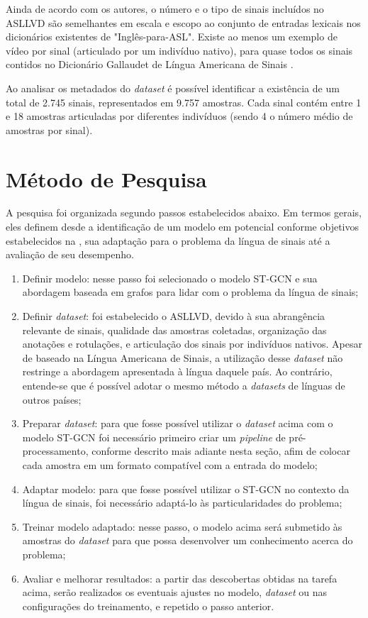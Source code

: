Ainda de acordo com os autores, o número e o tipo de sinais incluídos no ASLLVD são semelhantes em escala e escopo ao conjunto de entradas lexicais nos dicionários existentes de "Inglês-para-ASL". Existe ao menos um exemplo de vídeo por sinal (articulado por um indivíduo nativo), para quase todos os sinais contidos no Dicionário Gallaudet de Língua Americana de Sinais \cite{athitsos-asllvd-2008, gallaudet-2005}. 

Ao analisar os metadados do \textit{dataset} é possível identificar a existência de um total de 2.745 sinais, representados em 9.757 amostras. Cada sinal contém entre 1 e 18 amostras articuladas por diferentes indivíduos (sendo 4 o número médio de amostras por sinal).


\section{Método de Pesquisa} %

A pesquisa foi organizada segundo passos estabelecidos abaixo. Em termos gerais, eles definem desde a identificação de um modelo em potencial conforme objetivos estabelecidos na , sua adaptação para o problema da língua de sinais até a avaliação de seu desempenho.

\begin{enumerate}
    \item Definir modelo: nesse passo foi selecionado o modelo ST-GCN e sua abordagem baseada em grafos para lidar com o problema da língua de sinais;
    \item Definir \textit{dataset}: foi estabelecido o ASLLVD, devido à sua abrangência relevante de sinais, qualidade das amostras coletadas, organização das anotações e rotulações, e articulação dos sinais por indivíduos nativos. Apesar de baseado na Língua Americana de Sinais, a utilização desse \textit{dataset} não restringe a abordagem apresentada à língua daquele país. Ao contrário, entende-se que é possível adotar o mesmo método a \textit{datasets} de línguas de outros países;
    \item Preparar \textit{dataset}: para que fosse possível utilizar o \textit{dataset} acima com o modelo ST-GCN foi necessário primeiro criar um \textit{pipeline} de pré-processamento, conforme descrito mais adiante nesta seção, afim de colocar cada amostra em  um formato compatível com a entrada do modelo;
    \item Adaptar modelo: para que fosse possível utilizar o ST-GCN no contexto da língua de sinais, foi necessário adaptá-lo às particularidades do problema;
    \item Treinar modelo adaptado: nesse passo, o modelo acima será submetido às amostras do \textit{dataset} para que possa desenvolver um conhecimento acerca do problema;
    \item Avaliar e melhorar resultados: a partir das descobertas obtidas na tarefa acima, serão realizados os eventuais ajustes no modelo, \textit{dataset} ou nas configurações do treinamento, e repetido o passo anterior.
\end{enumerate}

